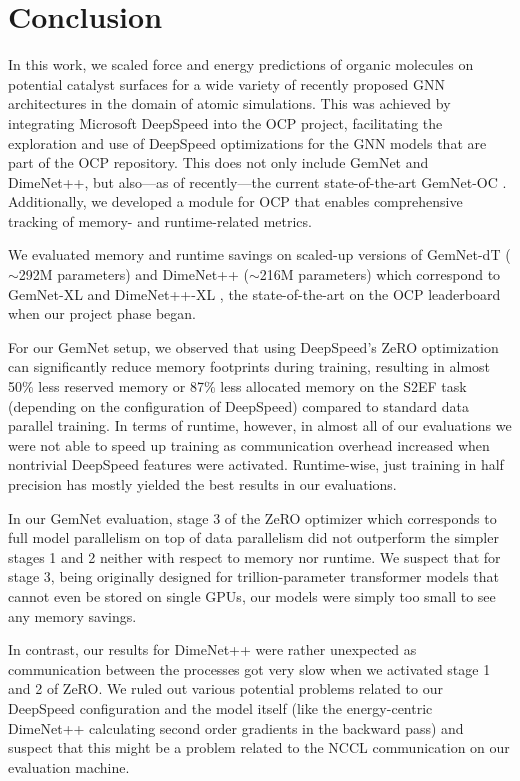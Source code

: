 \section{Conclusion}
\label{section:conclusion}

In this work, we scaled force and energy predictions of organic molecules on
potential catalyst surfaces for a wide variety of recently proposed GNN architectures
in the domain of atomic simulations. This was achieved by integrating Microsoft DeepSpeed 
into the OCP project, facilitating the exploration and use of DeepSpeed optimizations
for the GNN models that are part of the OCP repository. This does not
only include GemNet and DimeNet++, but also---as of recently---the current state-of-the-art
GemNet-OC \cite{https://doi.org/10.48550/arxiv.2204.02782}.
Additionally, we developed a module for OCP that enables comprehensive tracking
of memory- and runtime-related metrics. 

We evaluated memory and runtime savings on scaled-up versions of GemNet-dT
($\sim$292M parameters) and DimeNet++ ($\sim$216M parameters) which correspond to
GemNet-XL and DimeNet++-XL \cite{https://doi.org/10.48550/arxiv.2203.09697}, 
the state-of-the-art on the OCP leaderboard when our project phase began. 

For our GemNet setup, we observed that using DeepSpeed's ZeRO optimization 
can significantly reduce memory footprints during training, resulting in 
almost 50\% less reserved memory or 87\% less allocated memory on the S2EF task
(depending on the configuration of DeepSpeed) compared to standard data parallel training. 
In terms of runtime, however, in almost all of our evaluations we were not able to speed up 
training as communication overhead increased when 
nontrivial DeepSpeed features were activated. Runtime-wise, just training in half
precision has mostly yielded the best results in our evaluations.

In our GemNet evaluation, stage 3 of the ZeRO optimizer which corresponds to full model parallelism on top
of data parallelism did not outperform the simpler stages 1 and 2 neither with respect to
memory nor runtime. We suspect that for stage 3, being originally designed for trillion-parameter
transformer models that cannot even be stored on single GPUs, our models
were simply too small to see any memory savings.

In contrast, our results for DimeNet++ were rather unexpected as communication
between the processes got very slow when we activated stage 1 and 2 of ZeRO.
We ruled out various potential problems related to our DeepSpeed configuration and
the model itself (like the energy-centric DimeNet++ calculating second order gradients 
in the backward pass) and suspect that this might be a problem related to the NCCL communication on our evaluation 
machine.

